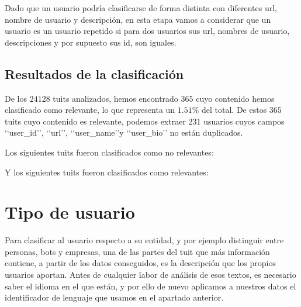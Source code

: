 Dado que un usuario podría clasificarse de forma distinta con diferentes url, nombre de usuario y 
descripción, en esta etapa vamos a considerar que un usuario es un usuario repetido si para dos 
usuarios sus url, nombres de usuario, descripciones y por supuesto sus id, son iguales.

\subsection{Resultados de la clasificación}
De los $24128$ tuits analizados, hemos encontrado $365$ cuyo contenido hemos clasificado como
relevante, lo que representa un $1.51$\% del total. De estos $365$ tuits
cuyo contenido es relevante, podemos extraer $231$ usuarios cuyos campos
\lq\lq user\_id\rq\rq, \lq\lq url\rq\rq, \lq\lq user\_name\rq\rq y \lq\lq user\_bio\rq\rq
no están duplicados.

Los siguientes tuits fueron clasificados como no relevantes:


Y los siguientes tuits fueron clasificados como relevantes:


\section{Tipo de usuario}
\label{sect:tipo_de_usuario}
Para clasificar al usuario respecto a su entidad, y por ejemplo distinguir entre personas, bots y empresas, 
una de las partes del tuit que más información contiene, a partir de los datos conseguidos, es
la descripción que los propios usuarios aportan. Antes de cualquier labor de análisis de esos textos,
es necesario saber el idioma en el que están, y por ello de nuevo aplicamos a nuestros datos 
el identificador de lenguaje que usamos en el apartado anterior. 


